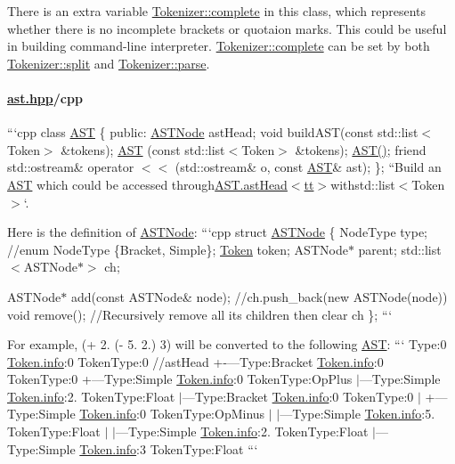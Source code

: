 There is an extra variable {\ttfamily \hyperlink{class_tokenizer_a330a4cce0cbf3ebfbe601d97022d1ed4}{Tokenizer\+::complete}} in this class, which represents whether there is no incomplete brackets or quotaion marks. This could be useful in building command-\/line interpreter. {\ttfamily \hyperlink{class_tokenizer_a330a4cce0cbf3ebfbe601d97022d1ed4}{Tokenizer\+::complete}} can be set by both {\ttfamily \hyperlink{class_tokenizer_a8bd8a4eb5df764f6128028daa0e9044b}{Tokenizer\+::split}} and {\ttfamily \hyperlink{class_tokenizer_ae928efe72c00908a3529747b4cfd01d5}{Tokenizer\+::parse}}.

\paragraph*{\hyperlink{ast_8hpp}{ast.\+hpp}/cpp}

```cpp class \hyperlink{class_a_s_t}{A\+S\+T} \{ public\+: \hyperlink{struct_a_s_t_node}{A\+S\+T\+Node} ast\+Head; void build\+A\+S\+T(const std\+::list$<$\+Token$>$ \&tokens); \hyperlink{class_a_s_t}{A\+S\+T} (const std\+::list$<$\+Token$>$ \&tokens); \hyperlink{class_a_s_t}{A\+S\+T()}; friend std\+::ostream\& operator $<$$<$ (std\+::ostream\& o, const \hyperlink{class_a_s_t}{A\+S\+T}\& ast); \}; ``{\ttfamily  Build an \hyperlink{class_a_s_t}{A\+S\+T} which could be accessed through}\hyperlink{class_a_s_t_a4f9b6d3be381682515e1e51c176b1c21}{A\+S\+T.\+ast\+Head$<$tt$>$}withstd\+::list$<$\+Token$>$`.

Here is the definition of {\ttfamily \hyperlink{struct_a_s_t_node}{A\+S\+T\+Node}}\+: ```cpp struct \hyperlink{struct_a_s_t_node}{A\+S\+T\+Node} \{ Node\+Type type; //enum Node\+Type \{Bracket, Simple\}; \hyperlink{struct_token}{Token} token; A\+S\+T\+Node$\ast$ parent; std\+::list$<$\+A\+S\+T\+Node$\ast$$>$ ch;

A\+S\+T\+Node$\ast$ add(const A\+S\+T\+Node\& node); //ch.push\+\_\+back(new A\+S\+T\+Node(node)) void remove(); //\+Recursively remove all its children then clear ch \}; ```

For example, {\ttfamily (+ 2. (-\/ 5. 2.) 3)} will be converted to the following \hyperlink{class_a_s_t}{A\+S\+T}\+: ``` Type\+:0 \hyperlink{struct_token_a4c338f6ca199f4a8575e877d36d03a06}{Token.\+info}\+:0 Token\+Type\+:0 //ast\+Head +-\/---Type\+:Bracket \hyperlink{struct_token_a4c338f6ca199f4a8575e877d36d03a06}{Token.\+info}\+:0 Token\+Type\+:0 +---Type\+:Simple \hyperlink{struct_token_a4c338f6ca199f4a8575e877d36d03a06}{Token.\+info}\+:0 Token\+Type\+:Op\+Plus $\vert$---Type\+:Simple \hyperlink{struct_token_a4c338f6ca199f4a8575e877d36d03a06}{Token.\+info}\+:2. Token\+Type\+:Float $\vert$---Type\+:Bracket \hyperlink{struct_token_a4c338f6ca199f4a8575e877d36d03a06}{Token.\+info}\+:0 Token\+Type\+:0 $\vert$ +---Type\+:Simple \hyperlink{struct_token_a4c338f6ca199f4a8575e877d36d03a06}{Token.\+info}\+:0 Token\+Type\+:Op\+Minus $\vert$ $\vert$---Type\+:Simple \hyperlink{struct_token_a4c338f6ca199f4a8575e877d36d03a06}{Token.\+info}\+:5. Token\+Type\+:Float $\vert$ $\vert$---Type\+:Simple \hyperlink{struct_token_a4c338f6ca199f4a8575e877d36d03a06}{Token.\+info}\+:2. Token\+Type\+:Float $\vert$---Type\+:Simple \hyperlink{struct_token_a4c338f6ca199f4a8575e877d36d03a06}{Token.\+info}\+:3 Token\+Type\+:Float ```

